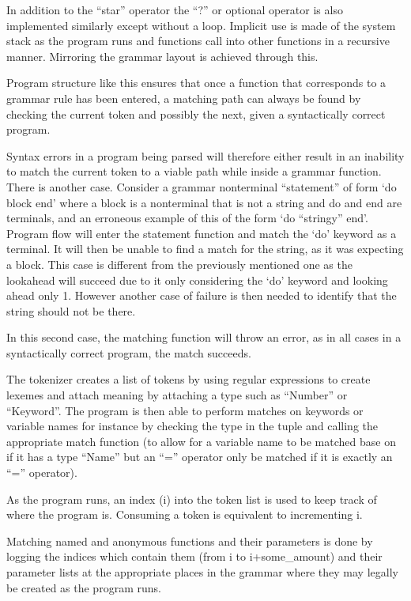 \documentclass[11pt]{article}
\begin{document}
    In addition to the ``star'' operator the ``?'' or optional operator is also implemented similarly except without a loop. Implicit use is made of the system stack as the program runs and functions call into other functions in a recursive manner. Mirroring the grammar layout is achieved through this.

    Program structure like this ensures that once a function that corresponds to a grammar rule has been entered, a matching path can always be found by checking the current token and possibly the next, given a syntactically correct program.

    Syntax errors in a program being parsed will therefore either result in an inability to match the current token to a viable path while inside a grammar function. There is another case. Consider a grammar nonterminal ``statement'' of form `do block end' where a block is a nonterminal that is not a string and do and end are terminals, and an erroneous example of this of the form `do ``stringy'' end'. Program flow will enter the statement function and match the `do' keyword as a terminal. It will then be unable to find a match for the string, as it was expecting a block. This case is different from the previously mentioned one as the lookahead will succeed due to it only considering the `do' keyword and looking ahead only 1. However another case of failure is then needed to identify that the string should not be there.

    In this second case, the matching function will throw an error, as in all cases in a syntactically correct program, the match succeeds.

    The tokenizer creates a list of tokens by using regular expressions to create lexemes and attach meaning by attaching a type such as ``Number'' or ``Keyword''. The program is then able to perform matches on keywords or variable names for instance by checking the type in the tuple and calling the appropriate match function (to allow for a variable name to be matched base on if it has a type ``Name'' but an ``='' operator only be matched if it is exactly an ``='' operator).

    As the program runs, an index (i) into the token list is used to keep track of where the program is. Consuming a token is equivalent to incrementing i.
    
    Matching named and anonymous functions and their parameters is done by logging the indices which contain them (from i to i+some\_amount) and their parameter lists at the appropriate places in the grammar where they may legally be created as the program runs.
\end{document}
